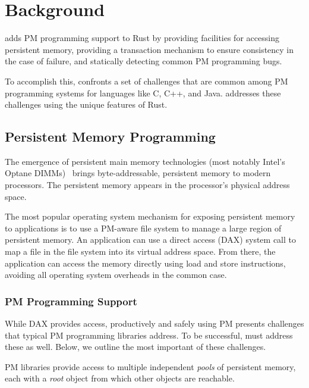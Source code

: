 \section{Background}
\label{sec:background}

\this{} adds PM programming support to Rust by providing facilities for
accessing persistent memory, providing a transaction mechanism to ensure
consistency in the case of failure, and statically detecting common PM
programming bugs.

To accomplish this, \this{}  confronts a set of challenges that are common
among PM programming systems for languages like C, C++, and Java.
\This{} addresses these challenges using the unique features of Rust.


\subsection{Persistent Memory Programming}
\label{sec:prog}

The emergence of persistent main memory technologies (most notably Intel's
Optane DIMMs)~\cite{3DXPoint} brings byte-addressable, persistent memory to
modern processors.  The persistent memory appears in the processor's physical
address space.

The most popular operating system mechanism for exposing persistent memory to
applications is to use a PM-aware file system to manage a large region of
persistent memory.  An application can use a direct access (DAX) \mmap{} system
call to map a file in the file system into its virtual address space.  From
there, the application can access the memory directly using load and store
instructions, avoiding all operating system overheads in the common case.

\subsubsection{PM Programming Support}

While DAX \mmap{} provides access, productively and safely using PM presents
challenges that typical PM programming libraries address.  To be
successful, \this{} must address these as well.  Below, we outline the most
important of these challenges.
  

PM libraries provide access to
multiple independent \emph{pools} of persistent memory, each with a \emph{root} object
from which other objects are reachable.

